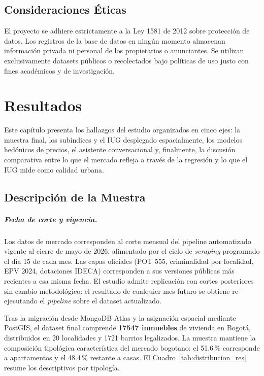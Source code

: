 \documentclass[12pt, a4paper, twoside, openright]{report}
\theoremstyle{plain}
\theoremstyle{definition}
\begin{document}
\section{Consideraciones Éticas}
El proyecto se adhiere estrictamente a la Ley 1581 de 2012 sobre protección de datos. Los registros de la base de datos en ningún momento almacenan información privada ni personal de los propietarios o anunciantes. Se utilizan exclusivamente datasets públicos o recolectados bajo políticas de uso justo con fines académicos y de investigación.


\chapter{Resultados}\label{ch:resultados}

Este capítulo presenta los hallazgos del estudio organizados en cinco ejes: la muestra final, los subíndices y el IUG desplegado espacialmente, los modelos hedónicos de precios, el asistente conversacional y, finalmente, la discusión comparativa entre lo que el mercado refleja a través de la regresión y lo que el IUG mide como calidad urbana.


\section{Descripción de la Muestra}\label{sec:muestra}

\paragraph{Fecha de corte y vigencia.}
Los datos de mercado corresponden al corte mensual del pipeline automatizado vigente al cierre de mayo de 2026, alimentado por el ciclo de \emph{scraping} programado el día 15 de cada mes. Las capas oficiales (POT 555, criminalidad por localidad, EPV 2024, dotaciones IDECA) corresponden a sus versiones públicas más recientes a esa misma fecha. El estudio admite replicación con cortes posteriores sin cambio metodológico: el resultado de cualquier mes futuro se obtiene re-ejecutando el \emph{pipeline} sobre el dataset actualizado.

Tras la migración desde MongoDB Atlas y la asignación espacial mediante PostGIS, el dataset final comprende \textbf{\num{17547} inmuebles} de vivienda en Bogotá, distribuidos en 20 localidades y \num{1721} barrios legalizados. La muestra mantiene la composición tipológica característica del mercado bogotano: el 51.6\,\% corresponde a apartamentos y el 48.4\,\% restante a casas. El Cuadro~\ref{tab:distribucion_res} resume los descriptivos por tipología.
\end{document}
